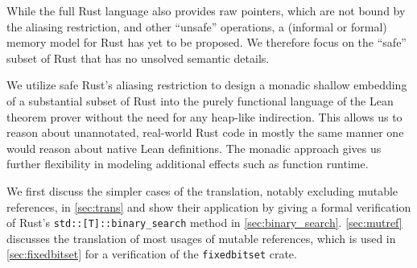 While the full Rust language also provides raw pointers, which are not bound by
the aliasing restriction, and other ``unsafe'' operations, a (informal or formal)
memory model for Rust has yet to be proposed. We therefore focus on the ``safe''
subset of Rust that has no unsolved semantic details.

We utilize safe Rust's aliasing restriction to design a monadic shallow embedding of a
substantial subset of Rust
into the purely functional language of the Lean~\cite{de2015lean} theorem prover without the need
for any heap-like indirection. This allows us to
reason about unannotated, real-world Rust code in mostly the same manner one would
reason about native Lean definitions. The monadic approach gives us further
flexibility in modeling additional effects such as function runtime.

We first discuss the simpler cases of the
translation, notably excluding mutable references, in \autoref{sec:trans} and
show their application by giving a formal verification of Rust's
\verb!std::[T]::binary_search! method in \autoref{sec:binary_search}.
\autoref{sec:mutref} discusses the translation of most usages of mutable
references, which is used in \autoref{sec:fixedbitset} for a verification of the
\texttt{fixedbitset} crate.